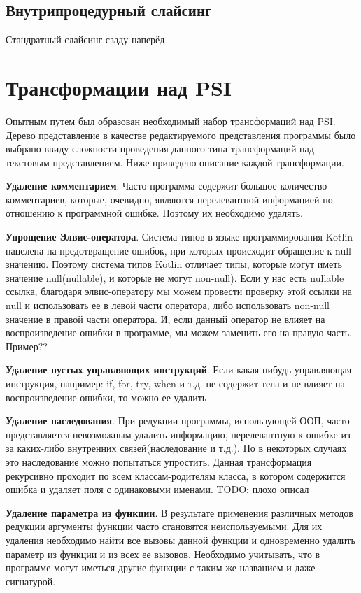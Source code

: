 \subsection{Внутрипроцедурный слайсинг}
Стандратный слайсинг сзаду-наперёд
\section{Трансформации над PSI}
Опытным путем был образован необходимый набор трансформаций над PSI. Дерево представление в качестве редактируемого представления программы было выбрано ввиду сложности проведения данного типа трансформаций над текстовым представлением. Ниже приведено описание каждой трансформации. 

\textbf{Удаление комментарием}. Часто программа содержит большое количество комментариев, которые, очевидно, являются нерелевантной информацией по отношению к программной ошибке. Поэтому их необходимо удалять.

\textbf{Упрощение Элвис-оператора}. Система типов в языке программирования Kotlin нацелена на предотвращение ошибок, при которых происходит обращение к null значению. Поэтому система типов Kotlin отличает типы, которые могут иметь значение null(nullable), и которые не могут non-null). Если у нас есть nullable ссылка, благодаря элвис-оператору мы можем провести проверку этой ссылки на null и использовать ее в левой части оператора, либо использовать non-null значение в правой части оператора. И, если данный оператор не влияет на воспроизведение ошибки в программе, мы можем заменить его на правую часть. Пример?? 

\textbf{Удаление пустых управляющих инструкций}. Если какая-нибудь управляющая инструкция, например: if, for, try, when и т.д. не содержит тела и не влияет на воспроизведение ошибки, то можно ее удалить

\textbf{Удаление наследования}. При редукции программы, использующей ООП, часто представляется невозможным удалить информацию, нерелевантную к ошибке из-за каких-либо внутренних связей(наследование и т.д.). Но в некоторых случаях это наследование можно попытаться упростить. Данная трансформация рекурсивно проходит по всем классам-родителям класса, в котором содержится ошибка и удаляет поля с одинаковыми именами. TODO: плохо описал

\textbf{Удаление параметра из функции}. В результате применения различных методов редукции аргументы функции часто становятся неиспользуемыми. Для их удаления необходимо найти все вызовы данной функции и одновременно удалить параметр из функции и из всех ее вызовов. Необходимо учитывать, что в программе могут иметься другие функции с таким же названием и даже сигнатурой.

